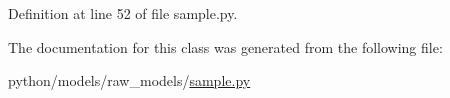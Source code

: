 Definition at line 52 of file sample.\-py.



The documentation for this class was generated from the following file\-:\begin{DoxyCompactItemize}
\item 
python/models/raw\-\_\-models/\hyperlink{sample_8py}{sample.\-py}\end{DoxyCompactItemize}
